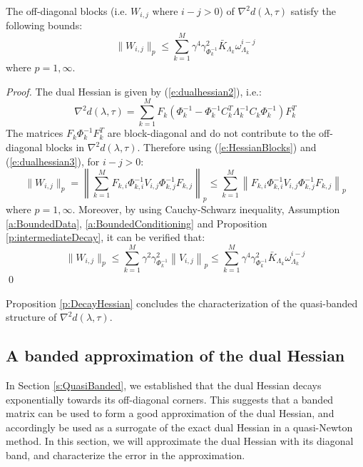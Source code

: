 \begin{proposition} \label{p:DecayHessian}
The off-diagonal blocks (i.e. $W_{i,j}$ where $i - j > 0$) of $\nabla^2 d(\lambda, \tau)$ satisfy the following bounds:
\begin{equation}
\label{e:DecayHessian}
\| W_{i,j} \|_p \leq \sum_{k=1}^M \gamma^4 \gamma_{\Phi_k^{-1}}^2 \bar{K}_{\Lambda_k} \omega_{\Lambda_k}^{i-j} 
\end{equation}
where $p=1,\infty$.
\end{proposition}
\begin{proof}
The dual Hessian is given by (\ref{e:dualhessian2}), i.e.:
\begin{equation} \label{e:dualhessian3}
\nabla^2 d(\lambda, \tau) = \sum_{k=1}^M F_k (\Phi_k^{-1} - \Phi_k^{-1} C_k^T \Lambda_k^{-1} C_k \Phi_k^{-1}) F_k^T
\end{equation}
The matrices $F_k \Phi_k^{-1} F_k^T$ are block-diagonal and do not contribute to the off-diagonal blocks in $\nabla^2 d(\lambda, \tau)$. Therefore using (\ref{e:HessianBlocks}) and (\ref{e:dualhessian3}), for $i - j > 0$:
\begin{equation}
\| W_{i,j} \|_p = \left\| \sum_{k=1}^M F_{k,i} \Phi_{k,i}^{-1} V_{i,j} \Phi_{k,j}^{-1} F_{k,j} \right\|_p \leq \sum_{k=1}^M \left\| F_{k,i} \Phi_{k,i}^{-1} V_{i,j} \Phi_{k,j}^{-1} F_{k,j} \right\|_p
\end{equation}
where $p=1,\infty$. Moreover, by using Cauchy-Schwarz inequality, Assumption \ref{a:BoundedData}, \ref{a:BoundedConditioning} and Proposition \ref{p:intermediateDecay}, it can be verified that:
\begin{equation}
\| W_{i,j} \|_p \leq \sum_{k=1}^M \gamma^2 \gamma_{\Phi_k^{-1}}^2 \left\| V_{i,j} \right\|_p \leq \sum_{k=1}^M \gamma^4 \gamma_{\Phi_k^{-1}}^2 \bar{K}_{\Lambda_k} \omega_{\Lambda_k}^{i-j}
\end{equation}
\qed
\end{proof}
Proposition \ref{p:DecayHessian} concludes the characterization of the quasi-banded structure of $\nabla^2 d(\lambda,\tau)$. 

\subsection{A banded approximation of the dual Hessian}

In Section \ref{s:QuasiBanded}, we established that the dual Hessian decays exponentially towards its off-diagonal corners. This suggests that a banded matrix can be used to form a good approximation of the dual Hessian, and accordingly be used as a surrogate of the exact dual Hessian in a quasi-Newton method. In this section, we will approximate the dual Hessian with its diagonal band, and characterize the error in the approximation.

